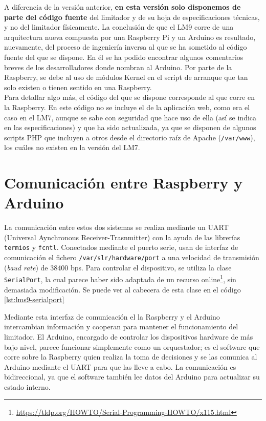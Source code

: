 A diferencia de la versión anterior, \textbf{en esta versión solo disponemos de parte del código fuente} del limitador y de su hoja de especificaciones técnicas, y no del limitador físicamente. La conclusión de que el LM9 corre de una arquitectura nueva compuesta por una Raspberry Pi y un Arduino es resultado, nuevamente, del proceso de ingeniería inversa al que se ha sometido al código fuente del que se dispone. En él se ha podido encontrar algunos comentarios breves de los desarrolladores donde nombran al Arduino. Por parte de la Raspberry, se debe al uso de módulos Kernel en el script de arranque que tan solo existen o tienen sentido en una Raspberry. \\
Para detallar algo más, el código del que se dispone corresponde al que corre en la Raspberry. En este código no se incluye el de la aplicación web, como era el caso en el LM7, aunque se sabe con seguridad que hace uso de ella (así se indica en las especificaciones) y que ha sido actualizada, ya que se disponen de algunos scripts PHP que incluyen a otros desde el directorio raíz de Apache (\verb|/var/www|), los cuáles no existen en la versión del LM7.

\section{Comunicación entre Raspberry y Arduino} \label{sec:lms9-uart}
La comunicación entre estos dos sistemas se realiza mediante un UART (Universal Aynchronous Receiver-Trasnmitter) con la ayuda de las librerías \verb|termios| y \verb|fcntl|. Conectados mediante el puerto serie, usan de interfaz de comunicación el fichero \verb|/var/slr/hardware/port| a una velocidad de transmisión (\textit{baud rate}) de 38400 bps. Para controlar el dispositivo, se utiliza la clase \verb|SerialPort|, la cual parece haber sido adaptada de un recurso online\footnote{\url{https://tldp.org/HOWTO/Serial-Programming-HOWTO/x115.html}}, sin demasiada modificación. Se puede ver al cabecera de esta clase en el código \ref{lst:lms9-serialport}

Mediante esta interfaz de comunicación el la Raspberry y el Arduino intercambian información y cooperan para mantener el funcionamiento del limitador. El Arduino, encargado de controlar los dispositivos hardware de más bajo nivel, parece funcionar simplemente como un orquestador; es el software que corre sobre la Raspberry quien realiza la toma de decisiones y se las comunica al Arduino mediante el UART para que las lleve a cabo. La comunicación es bidireccional, ya que el software también lee datos del Arduino para actualizar su estado interno. \\

